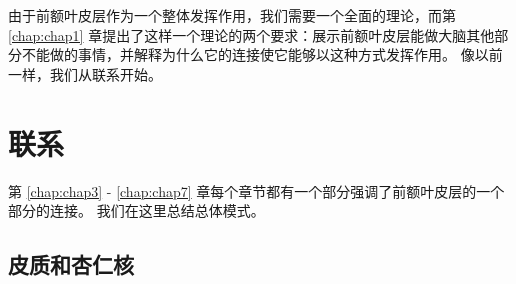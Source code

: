 由于前额叶皮层作为一个整体发挥作用，我们需要一个全面的理论，而第 \ref{chap:chap1} 章提出了这样一个理论的两个要求：展示前额叶皮层能做大脑其他部分不能做的事情，并解释为什么它的连接使它能够以这种方式发挥作用。
像以前一样，我们从联系开始。



\section{联系}
\par
第 \ref{chap:chap3} - \ref{chap:chap7} 章每个章节都有一个部分强调了前额叶皮层的一个部分的连接。
我们在这里总结总体模式。



\subsection{皮质和杏仁核}

